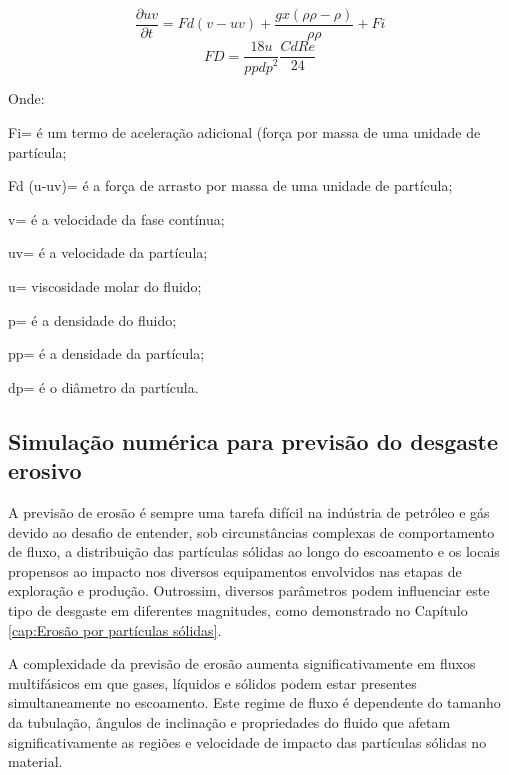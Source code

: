\begin{equation}
\frac{\partial uv}{\partial{}t}=Fd (v-uv)+ \frac{gx(\rho\rho -\rho )} {\rho\rho}+Fi
\end{equation}
\begin{equation}
FD=\frac{18u}{pp {dp}^2} \frac{CdRe}{24}
\label{eqn:euleriano}
\end{equation}

Onde:

 Fi= é um termo de aceleração adicional (força por massa de uma unidade de partícula;
 
 Fd (u-uv)= é a força de arrasto por massa de uma unidade de partícula;
 
 v= é a velocidade da fase contínua;
 
 uv= é a velocidade da partícula;
 
 u= viscosidade molar do fluido;
 
 p= é a densidade do fluido;
 
 pp= é a densidade da partícula;
 
 dp= é o diâmetro da partícula.



\subsection{Simulação numérica para previsão do desgaste erosivo}

A previsão de erosão é sempre uma tarefa difícil na indústria de petróleo e gás devido ao desafio de entender, sob circunstâncias complexas de comportamento de fluxo, a distribuição das partículas sólidas ao longo do escoamento e os locais propensos ao impacto nos diversos equipamentos envolvidos nas etapas de exploração e produção. Outrossim, diversos parâmetros podem influenciar este tipo de desgaste em diferentes magnitudes, como demonstrado no Capítulo \ref{cap:Erosão por partículas sólidas}.

A complexidade da previsão de erosão aumenta significativamente em fluxos multifásicos em que gases, líquidos e sólidos podem estar presentes simultaneamente no escoamento.  Este regime de fluxo é dependente do tamanho da tubulação, ângulos de inclinação e propriedades do fluido que afetam significativamente as regiões e velocidade de impacto das partículas sólidas no material.

